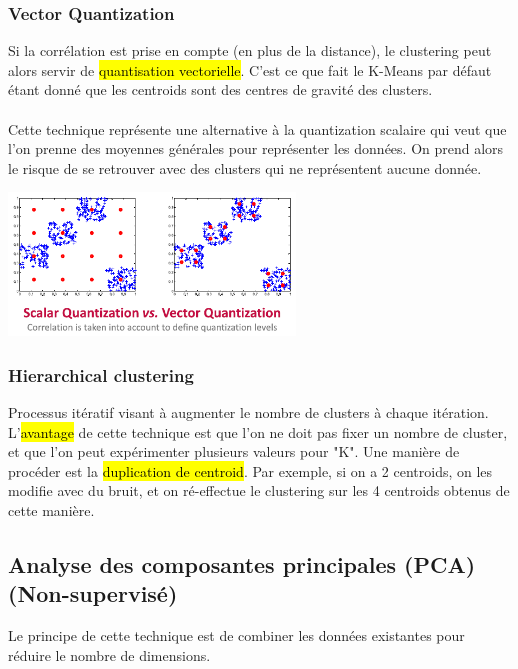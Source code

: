 \documentclass[letterpaper, 12pt]{article}
\newcommand{\alinea}{
\hspace*{0.5cm}}
\begin{document}
			\subsubsection{Vector Quantization}
				\alinea Si la corrélation est prise en compte (en plus de la distance), le clustering peut alors servir de \hl{quantisation
					vectorielle}. C'est ce que fait le K-Means par défaut étant donné que les centroids sont des centres de gravité des 
					clusters.\\
				~\\
				\alinea Cette technique représente une alternative à la quantization scalaire qui veut que l'on prenne des 
					moyennes générales pour représenter les données. On prend alors le risque de se retrouver avec des clusters qui
					ne représentent aucune donnée.
				\begin{center}
					\includegraphics[width=3in]{Images/vector-quantization}
				\end{center}
			\subsubsection{Hierarchical clustering}
				\alinea Processus itératif visant à augmenter le nombre de clusters à chaque itération. L'\hl{avantage} de cette technique
					est que l'on ne doit pas fixer un nombre de cluster, et que l'on peut expérimenter plusieurs valeurs pour "K".
					Une manière de procéder est la \hl{duplication de centroid}. Par exemple, si on a 2 centroids, on les modifie
					avec du bruit, et on ré-effectue le clustering sur les 4 centroids obtenus de cette manière.	
		\subsection{Analyse des composantes principales (PCA) (Non-supervisé)}
			\alinea Le principe de cette technique est de combiner les données existantes pour réduire le nombre de dimensions.
\end{document}
